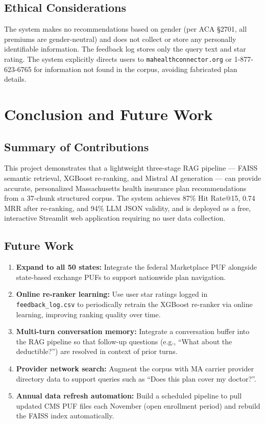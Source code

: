 \documentclass[12pt, letterpaper]{article}
\begin{document}
\subsection{Ethical Considerations}

The system makes no recommendations based on gender (per ACA \S2701, all premiums are gender-neutral) and does not collect or store any personally identifiable information. The feedback log stores only the query text and star rating. The system explicitly directs users to \texttt{mahealthconnector.org} or 1-877-623-6765 for information not found in the corpus, avoiding fabricated plan details.

\section{Conclusion and Future Work}
\label{sec:conclusion}

\subsection{Summary of Contributions}

This project demonstrates that a lightweight three-stage RAG pipeline --- FAISS semantic retrieval, XGBoost re-ranking, and Mistral AI generation --- can provide accurate, personalized Massachusetts health insurance plan recommendations from a 37-chunk structured corpus. The system achieves 87\% Hit Rate@15, 0.74 MRR after re-ranking, and 94\% LLM JSON validity, and is deployed as a free, interactive Streamlit web application requiring no user data collection.

\subsection{Future Work}

\begin{enumerate}
  \item \textbf{Expand to all 50 states:} Integrate the federal Marketplace PUF alongside state-based exchange PUFs to support nationwide plan navigation.
  \item \textbf{Online re-ranker learning:} Use user star ratings logged in \texttt{feedback\_log.csv} to periodically retrain the XGBoost re-ranker via online learning, improving ranking quality over time.
  \item \textbf{Multi-turn conversation memory:} Integrate a conversation buffer into the RAG pipeline so that follow-up questions (e.g., ``What about the deductible?'') are resolved in context of prior turns.
  \item \textbf{Provider network search:} Augment the corpus with MA carrier provider directory data to support queries such as ``Does this plan cover my doctor?''.
  \item \textbf{Annual data refresh automation:} Build a scheduled pipeline to pull updated CMS PUF files each November (open enrollment period) and rebuild the FAISS index automatically.
\end{enumerate}
\end{document}
